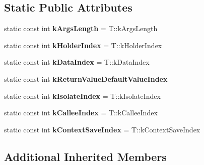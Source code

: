 \subsection*{Static Public Attributes}
\begin{DoxyCompactItemize}
\item 
\hypertarget{classv8_1_1internal_1_1_function_callback_arguments_a418aef384caf837dd281952afb2ae5a7}{}static const int {\bfseries k\+Args\+Length} = T\+::k\+Args\+Length\label{classv8_1_1internal_1_1_function_callback_arguments_a418aef384caf837dd281952afb2ae5a7}

\item 
\hypertarget{classv8_1_1internal_1_1_function_callback_arguments_a1b198f7e951f79e969f19a627250bc8f}{}static const int {\bfseries k\+Holder\+Index} = T\+::k\+Holder\+Index\label{classv8_1_1internal_1_1_function_callback_arguments_a1b198f7e951f79e969f19a627250bc8f}

\item 
\hypertarget{classv8_1_1internal_1_1_function_callback_arguments_a128ce8dd01b7536c09ac8424f656a627}{}static const int {\bfseries k\+Data\+Index} = T\+::k\+Data\+Index\label{classv8_1_1internal_1_1_function_callback_arguments_a128ce8dd01b7536c09ac8424f656a627}

\item 
static const int {\bfseries k\+Return\+Value\+Default\+Value\+Index}
\item 
\hypertarget{classv8_1_1internal_1_1_function_callback_arguments_a1381736593fe4d9bf415e577662ac8d9}{}static const int {\bfseries k\+Isolate\+Index} = T\+::k\+Isolate\+Index\label{classv8_1_1internal_1_1_function_callback_arguments_a1381736593fe4d9bf415e577662ac8d9}

\item 
\hypertarget{classv8_1_1internal_1_1_function_callback_arguments_a113666386ff34888b2da7a750e8336ba}{}static const int {\bfseries k\+Callee\+Index} = T\+::k\+Callee\+Index\label{classv8_1_1internal_1_1_function_callback_arguments_a113666386ff34888b2da7a750e8336ba}

\item 
\hypertarget{classv8_1_1internal_1_1_function_callback_arguments_acd7df7ab491d09c1332a2627da688a70}{}static const int {\bfseries k\+Context\+Save\+Index} = T\+::k\+Context\+Save\+Index\label{classv8_1_1internal_1_1_function_callback_arguments_acd7df7ab491d09c1332a2627da688a70}

\end{DoxyCompactItemize}
\subsection*{Additional Inherited Members}


